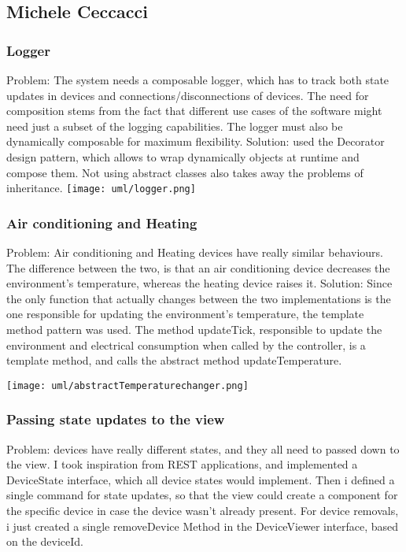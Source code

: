 \subsection{Michele Ceccacci}

\subsubsection{Logger} 
Problem: The system needs a composable logger, which has to track both state updates in devices and connections/disconnections
of devices. The need for composition stems from the fact that different use cases of the software might need just a subset
of the logging capabilities. The logger must also be dynamically composable for maximum flexibility.
Solution: used the Decorator design pattern, which allows to wrap dynamically objects at runtime and compose them.
Not using abstract classes also takes away the problems of inheritance. \newline
\texttt{[image: uml/logger.png]}

\subsubsection{Air conditioning and Heating}
Problem: 
Air conditioning and Heating devices have really similar behaviours. The difference between the two, is that an air conditioning
device decreases the environment's temperature, whereas the heating device raises it.
Solution: Since the only function that actually changes between the two implementations is the one responsible for updating the
environment's temperature, the template method pattern was used. 
The method updateTick, responsible to update the environment and electrical consumption when called by the controller,
is a template method, and calls the abstract method updateTemperature. \newline

\texttt{[image: uml/abstractTemperaturechanger.png]}

\subsubsection{Passing state updates to the view}
Problem: devices have really different states, and they all need to passed down to the view.
I took inspiration from REST applications, and implemented a DeviceState interface, which all device states would implement.
Then i defined a single command for state updates, so that the view could create a component for the specific device in case
the device wasn't already present. For device removals, i just created a single removeDevice Method in the DeviceViewer interface, 
based on the deviceId. \newline %
